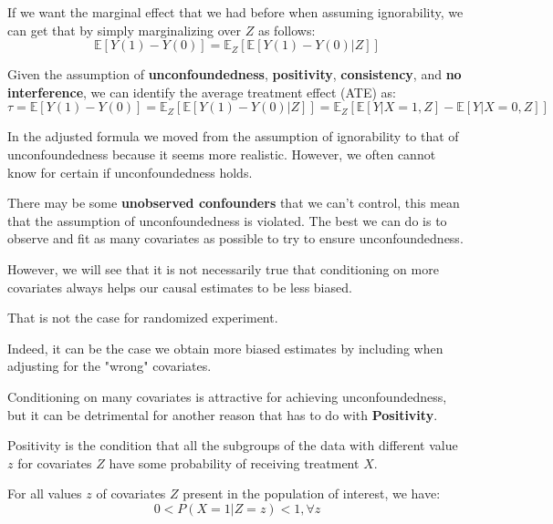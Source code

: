 If we want the marginal effect that we had before when assuming ignorability, we
can get that by simply marginalizing over $Z$ as follows:
\begin{equation}
    \mathbb{E}[Y(1) - Y(0)] = \mathbb{E}_Z[\mathbb{E}[Y(1) - Y(0) | Z]]
\end{equation}

\begin{definition}
    Given the assumption of \textbf{unconfoundedness}, \textbf{positivity},
    \textbf{consistency}, and \textbf{no interference}, we can identify the average
    treatment effect (ATE) as:
    \begin{equation}
        \tau = \mathbb{E}[Y(1) - Y(0)] = \mathbb{E}_Z[\mathbb{E}[Y(1) - Y(0) | Z]]
        = \mathbb{E}_Z[\mathbb{E}[Y|X = 1, Z] - \mathbb{E}[Y|X = 0, Z]]
    \end{equation}
\end{definition}

In the adjusted formula we moved from the assumption of ignorability to that
of unconfoundedness because it seems more realistic. However, we often cannot
know for certain if unconfoundedness holds.

There may be some \textbf{unobserved confounders} that we can't control, this mean
that the assumption of unconfoundedness is violated. The best we can do is to
observe and fit as many covariates as possible to try to ensure unconfoundedness.

However, we will see that it is not necessarily true that conditioning on more
covariates always helps our causal estimates to be less biased.

\begin{note}
    That is not the case for randomized experiment.
\end{note}

Indeed, it can be the case we obtain more biased estimates by including when
adjusting for the "wrong" covariates.

Conditioning on many covariates is attractive for achieving unconfoundedness, but
it can be detrimental for another reason that has to do with \textbf{Positivity}.

\begin{definition}
    Positivity is the condition that all the subgroups of the data with different
    value $z$ for covariates $Z$ have some probability of receiving treatment $X$.

    For all values $z$ of covariates $Z$ present in the population of interest,
    we have:
    \begin{equation}
        0 < P(X = 1 | Z = z) < 1, \forall z
    \end{equation}
\end{definition}

